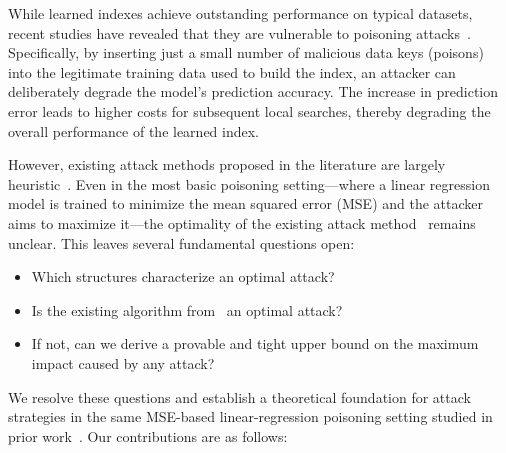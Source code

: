 \documentclass[acmsmall]{acmart}
\begin{document}
While learned indexes achieve outstanding performance on typical datasets, recent studies have revealed that they are vulnerable to poisoning attacks~\cite{kornaropoulos2022price,dong2025poisoning}.
Specifically, by inserting just a small number of malicious data keys (poisons) into the legitimate training data used to build the index, an attacker can deliberately degrade the model's prediction accuracy.
The increase in prediction error leads to higher costs for subsequent local searches, thereby degrading the overall performance of the learned index.

However, existing attack methods proposed in the literature are largely heuristic~\citep{yang2023algorithmic,schuster2025learned}.
Even in the most basic poisoning setting---where a linear regression model is trained to minimize the mean squared error (MSE) and the attacker aims to maximize it---the optimality of the existing attack method~\cite{kornaropoulos2022price} remains unclear.
This leaves several fundamental questions open:
\begin{itemize}[leftmargin=1.5em]
    \item Which structures characterize an optimal attack?
    \item Is the existing algorithm from~\cite{kornaropoulos2022price} an optimal attack?
    \item If not, can we derive a provable and tight upper bound on the maximum impact caused by any attack?
\end{itemize}
We resolve these questions and establish a theoretical foundation for attack strategies in the same MSE-based linear-regression poisoning setting studied in prior work~\cite{kornaropoulos2022price}.
Our contributions are as follows:
\end{document}
